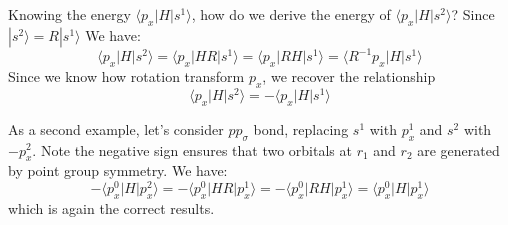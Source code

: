 \documentclass{article}
\begin{document}
Knowing the energy $\langle p_x | H | s^1 \rangle$, how do we derive the energy 
of $\langle p_x | H | s^2 \rangle$? Since $| s^2 \rangle = R | s^1 \rangle$ We have:
\begin{equation}
    \langle p_x | H | s^2 \rangle = \langle p_x | H R | s^1 \rangle
    = \langle p_x | R H | s^1 \rangle = \langle R^{-1} p_x | H | s^1 \rangle
\end{equation}
Since we know how rotation transform $p_x$, we recover the relationship 
\begin{equation}
    \langle p_x | H | s^2 \rangle = - \langle p_x | H | s^1 \rangle
\end{equation}

As a second example, let's consider $pp_{\sigma}$ bond, replacing $s^1$ with $p_x^1$ 
and $s^2$ with $-p_x^2$. Note the negative sign ensures that two orbitals at $r_1$ and $r_2$
are generated by point group symmetry. 
We have:
\begin{equation}
    - \langle p_x^0 | H | p_x^2 \rangle =  - \langle p_x^0 | HR | p_x^1 \rangle 
    = - \langle p_x^0 | RH | p_x^1 \rangle = \langle p_x^0 | H | p_x^1 \rangle
\end{equation} 
which is again the correct results. 
\end{document}
